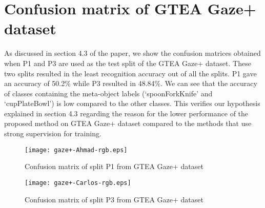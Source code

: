 \documentclass{bmvc2k}
\begin{document}
\section{Confusion matrix of GTEA Gaze+ dataset}
\label{sec:3}
As discussed in section 4.3 of the paper, we show the
confusion matrices obtained when P1 and P3 are used as the test split of the GTEA Gaze+ dataset. These two splits resulted in the least recognition accuracy out of all the splits. P1 gave an accuracy of 50.2\% while P3 resulted in 48.84\%. We can see that the accuracy of classes containing the meta-object labels (`spoonForkKnife' and `cupPlateBowl') is low compared to the other classes. This verifies our hypothesis explained in section 4.3 regarding the reason for the lower performance of the proposed method on GTEA Gaze+ dataset compared to the methods that use strong supervision for training.
\begin{figure}[h]
	\centering
	
	\texttt{[image: gaze+-Ahmad-rgb.eps]}
	
	\caption{Confusion matrix of split P1 from GTEA Gaze+ dataset}
\end{figure}

\begin{figure}[h]
	\centering
	
	\texttt{[image: gaze+-Carlos-rgb.eps]}
	
	\caption{Confusion matrix of split P3 from GTEA Gaze+ dataset}
\end{figure}
\end{document}

